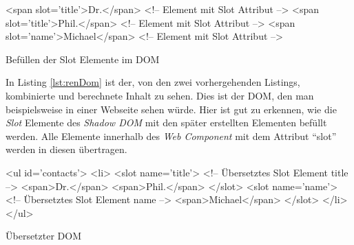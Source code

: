 \documentclass[12pt, paper=a4, bibtotoc, toc=listof, headsepline=true]{scrreprt}
\begin{document}
			\begin{listing}
				\begin{HTMLcode*}{}
<span slot='title'>Dr.</span> <!-- Element mit Slot Attribut -->
<span slot='title'>Phil.</span> <!-- Element mit Slot Attribut -->
<span slot='name'>Michael</span> <!-- Element mit Slot Attribut -->
				\end{HTMLcode*}
				\caption{Befüllen der Slot Elemente im DOM}
				\label{lst:sloNutLigDom}
			\end{listing}
			In Listing \ref{lst:renDom} ist der, von den zwei vorhergehenden Listings,  kombinierte und berechnete Inhalt zu sehen. Dies ist der \ac{DOM}, den man beispielsweise in einer Webseite sehen würde. Hier ist gut zu erkennen, wie die \emph{Slot} Elemente des \emph{Shadow \ac{DOM}} mit den später erstellten Elementen befüllt werden. Alle Elemente innerhalb des \emph{Web Component} mit dem Attribut \enquote{slot} werden in diesen übertragen.
			\begin{listing}
				\begin{HTMLcode*}{}
<ul id='contacts'>
   <li>
      <slot name='title'> <!-- Übersetztes Slot Element title -->
	     <span>Dr.</span>
	     <span>Phil.</span>
	  </slot>
      <slot name='name'> <!-- Übersetztes Slot Element name -->
	     <span>Michael</span>
      </slot>
   </li>
</ul>
				\end{HTMLcode*}
				\caption{Übersetzter DOM}
				\label{lst:renDom}
			\end{listing}
\end{document}
